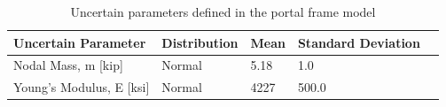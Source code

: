 \begin{table}[hbt!]                       
  \centering
\begin{adjustbox}{max width=\textwidth}            
  \begin{tabular}{lllll}                    
    \toprule          
      Uncertain Parameter & 	Distribution	 &  Mean  &  Standard Deviation \\ \hline
	Nodal Mass, m [kip]	 & Normal & 	5.18	 & 1.0 \\ \hline
	Young’s Modulus, E [ksi] & 	Normal	 & 4227	 & 500.0 \\ \hline
  \end{tabular}
\end{adjustbox}
  \caption{ Uncertain parameters defined in the portal frame model}             
  \label{tab:uncertainty}                 
\end{table}



